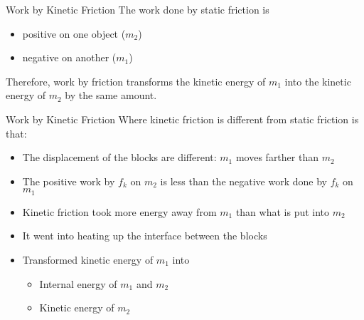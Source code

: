 \documentclass[12pt,compress,aspectratio=169]{beamer}
\begin{document}
\begin{frame}{Work by Kinetic Friction}
  The work done by static friction is
  \begin{itemize}
  \item positive on one object ($m_2$)
  \item negative on another ($m_1$)
  \end{itemize}
  Therefore, work by friction transforms the kinetic energy of $m_1$ into the
  kinetic energy of $m_2$ by the same amount.
\end{frame}



\begin{frame}{Work by Kinetic Friction}
  Where kinetic friction is different from static friction is that:
  \begin{itemize}
  \item The displacement of the blocks are different: $m_1$ moves farther than
    $m_2$
  \item The positive work by $f_k$ on $m_2$ is less than the negative work done
    by $f_k$ on $m_1$
  \item<2->Kinetic friction took more energy away from $m_1$ than what is put
    into $m_2$
  \end{itemize}
  \begin{itemize}
  \item<4-> It went into heating up the interface between the blocks
  \item<4-> Transformed kinetic energy of $m_1$ into
    \begin{itemize}
    \item Internal energy of $m_1$ and $m_2$
    \item Kinetic energy of $m_2$ 
    \end{itemize}
  \end{itemize}
\end{frame}
\end{document}
